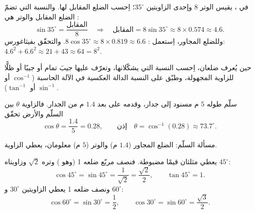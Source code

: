\begin{example}\label{ex:g9:trig:side}
في ، يقيس الوتر $8$ وإحدى الزاويتين
$35^\circ$؛ اِحسب الضلع المقابل لها. والنسبة التي تضمّ الضلع
المقابل والوتر هي :
\[
\sin 35^\circ = \frac{\text{المقابل}}{8}
\quad\Longrightarrow\quad
\text{المقابل} = 8 \sin 35^\circ \approx 8 \times 0.574 \approx 4.6 .
\]
وللضلع المجاور، اِستعمل :
$8\cos 35^\circ \approx 8 \times 0.819 \approx 6.6$. والتحقّق
بفيثاغورس: $4.6^2 + 6.6^2 \approx 21 + 43 \approx 64 = 8^2$.
\end{example}

\begin{method}\label{met:g9:trig:angle}
حين يُعرف ضلعان، اِحسب النسبة التي يشكّلانها، وتعرّف عليها
جيبَ تمام أو جيبًا أو ظلًّا للزاوية المجهولة، وطبّق على
النسبة الدالة العكسية في الآلة الحاسبة ($\cos^{-1}$
أو $\sin^{-1}$ أو $\tan^{-1}$).
\end{method}

\begin{example}\label{ex:g9:trig:angle}
سلّم طوله $5$ م مسنود إلى جدار، وقدمه على بعد $1.4$ م من الجدار.
فالزاوية $\theta$ بين السلّم والأرض تحقّق
\[
\cos\theta = \frac{1.4}{5} = 0.28,
\qquad\text{إذن}\quad
\theta = \cos^{-1}(0.28) \approx 73.7^\circ .
\]
\end{example}

\begin{omfigure}

{\small مسألة السلّم: الضلع المجاور ($1.4$ م) والوتر ($5$ م)
معلومان،  يعطي الزاوية.}
\end{omfigure}

\begin{example}\label{ex:g9:trig:special}
يعطي مثلثان قيمًا مضبوطة. فنصف مربّع ضلعه 1 (وهو  ) وتره $\sqrt2$ وزاويتاه $45^\circ$:
\[
\cos 45^\circ = \sin 45^\circ = \frac{1}{\sqrt2} = \frac{\sqrt2}{2},
\qquad \tan 45^\circ = 1 .
\]
ونصف  ضلعه 1 يعطي الزاويتين $30^\circ$
و $60^\circ$:
\[
\cos 60^\circ = \sin 30^\circ = \frac12,
\qquad
\cos 30^\circ = \sin 60^\circ = \frac{\sqrt3}{2}.
\]
\end{example}

